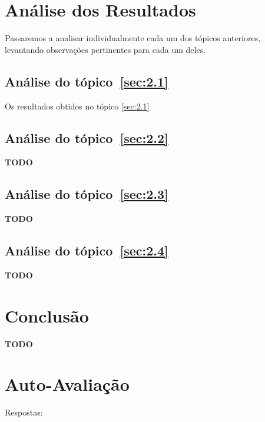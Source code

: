 \documentclass[12pt]{article}
\begin{document}
\section{Análise dos Resultados}\label{sec:resultados}

Passaremos a analisar individualmente cada um dos tópicos anteriores, levantando
observações pertinentes para cada um deles.

\subsection{Análise do tópico~\ref{sec:2.1}}\label{sec:analise2.1}

Os resultados obtidos no tópico \ref{sec:2.1} 

\subsection{Análise do tópico~\ref{sec:2.2}}\label{sec:analise2.2}

\textbf{TODO}

\subsection{Análise do tópico~\ref{sec:2.3}}\label{sec:analise2.3}

\textbf{TODO}

\subsection{Análise do tópico~\ref{sec:2.4}}\label{sec:analise2.4}

\textbf{TODO}

\section{Conclusão}\label{sec:Conclusao}

\textbf{TODO}




\newpage
\section*{Auto-Avaliação}

Respostas:
\end{document}
